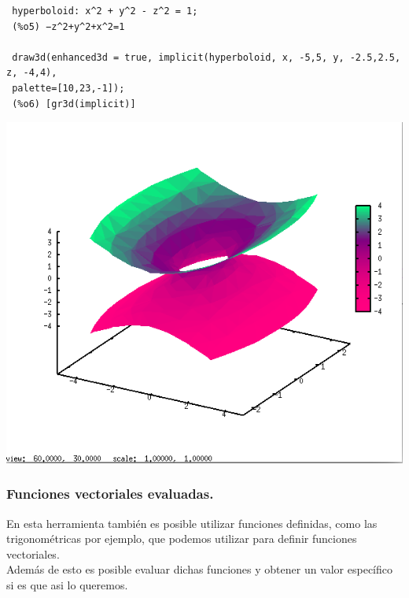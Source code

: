 \documentclass[12pt]{article}
\begin{document}
 \begin{verbatim}
 hyperboloid: x^2 + y^2 - z^2 = 1;
 (%o5) −z^2+y^2+x^2=1

 draw3d(enhanced3d = true, implicit(hyperboloid, x, -5,5, y, -2.5,2.5, z, -4,4),
 palette=[10,23,-1]);
 (%o6) [gr3d(implicit)]
 \end{verbatim}

 \includegraphics[scale=0.4]{actividad8.png}

\subsubsection*{Funciones vectoriales evaluadas.}

 En esta herramienta también es posible utilizar funciones definidas, como las trigonométricas por ejemplo, que podemos utilizar para definir funciones vectoriales.\\

 Además de esto es posible evaluar dichas funciones y obtener un valor específico si es que asi lo queremos.
\end{document}
